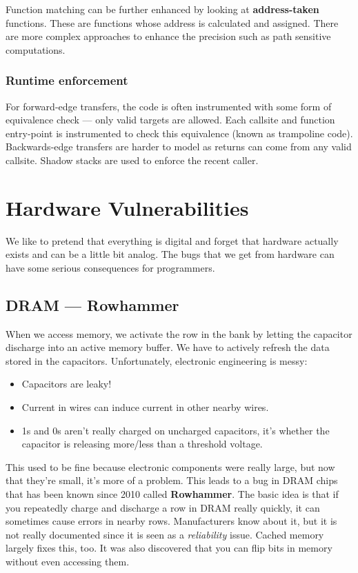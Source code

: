 \documentclass[11pt,a4paper,titlepage,dvipsnames,cmyk]{scrartcl}
\begin{document}
Function matching can be further enhanced by looking at \textbf{address-taken} functions. These are functions whose address is calculated and assigned. There are more complex approaches to enhance the precision such as path sensitive computations.

\subsubsection{Runtime enforcement}
For forward-edge transfers, the code is often instrumented with some form of equivalence check --- only valid targets are allowed. Each callsite and function entry-point is instrumented to check this equivalence (known as trampoline code). Backwards-edge transfers are harder to model as returns can come from any valid callsite. Shadow stacks are used to enforce the recent caller.

\section{Hardware Vulnerabilities}
We like to pretend that everything is digital and forget that hardware actually exists and can be a little bit analog. The bugs that we get from hardware can have some serious consequences for programmers.

\subsection{DRAM --- Rowhammer}
When we access memory, we activate the row in the bank by letting the capacitor discharge into an active memory buffer. We have to actively refresh the data stored in the capacitors. Unfortunately, electronic engineering is messy:
\begin{itemize}
    \item Capacitors are leaky!
    \item Current in wires can induce current in other nearby wires.
    \item 1s and 0s aren't really charged on uncharged capacitors, it's whether the capacitor is releasing more/less than a threshold voltage.
\end{itemize}

This used to be fine because electronic components were really large, but now that they're small, it's more of a problem. This leads to a bug in DRAM chips that has been known since 2010 called \textbf{Rowhammer}. The basic idea is that if you repeatedly charge and discharge a row in DRAM really quickly, it can sometimes cause errors in nearby rows. Manufacturers know about it, but it is not really documented since it is seen as a \textit{reliability} issue. Cached memory largely fixes this, too. It was also discovered that you can flip bits in memory without even accessing them.
\end{document}
